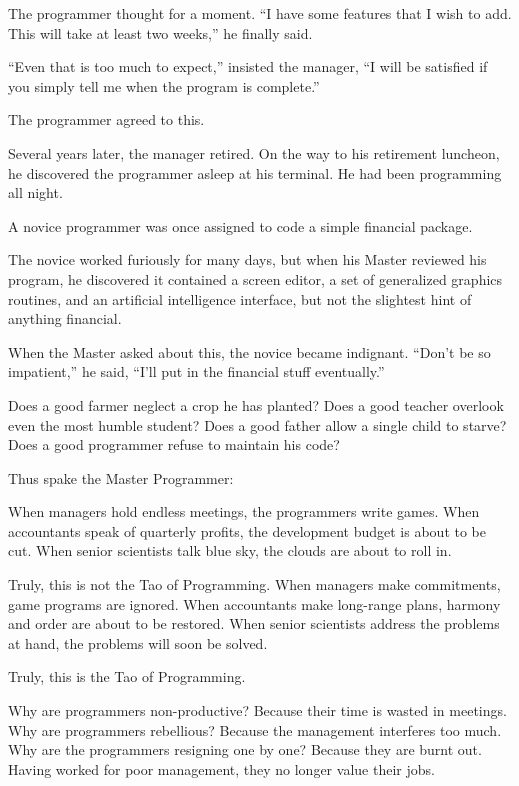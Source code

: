 The programmer thought for a moment. ``I have some features that I
wish to add. This will take at least two weeks,'' he finally said.

``Even that is too much to expect,'' insisted the manager, ``I will be
satisfied if you simply tell me when the program is complete.''

The programmer agreed to this.

Several years later, the manager retired. On the way to his retirement
luncheon, he discovered the programmer asleep at his terminal. He had
been programming all night.

A novice programmer was once assigned to code a simple financial package.

The novice worked furiously for many days, but when his Master
reviewed his program, he discovered it contained a screen editor, a
set of generalized graphics routines, and an artificial intelligence
interface, but not the slightest hint of anything financial.

When the Master asked about this, the novice became indignant. ``Don't
be so impatient,'' he said, ``I'll put in the financial stuff
eventually.''

%
Does a good farmer neglect a crop he has planted?
Does a good teacher overlook even the most humble student?
Does a good father allow a single child to starve?
Does a good programmer refuse to maintain his code?
\endverse

Thus spake the Master Programmer:

%
When managers hold endless meetings,
\quad the programmers write games.
When accountants speak of quarterly profits,
\quad the development budget is about to be cut.
When senior scientists talk blue sky,
\quad the clouds are about to roll in.
\endverse

Truly, this is not the Tao of Programming.
\startverse%
When managers make commitments,
\quad game programs are ignored.
When accountants make long-range plans,
\quad harmony and order are about to be restored.
When senior scientists address the problems at hand,
\quad the problems will soon be solved.
\endverse

Truly, this is the Tao of Programming.

%
Why are programmers non-productive?
\quad Because their time is wasted in meetings.
Why are programmers rebellious?
\quad Because the management interferes too much.
Why are the programmers resigning one by one?
\quad Because they are burnt out.
Having worked for poor management,
\quad they no longer value their jobs.
\endverse

